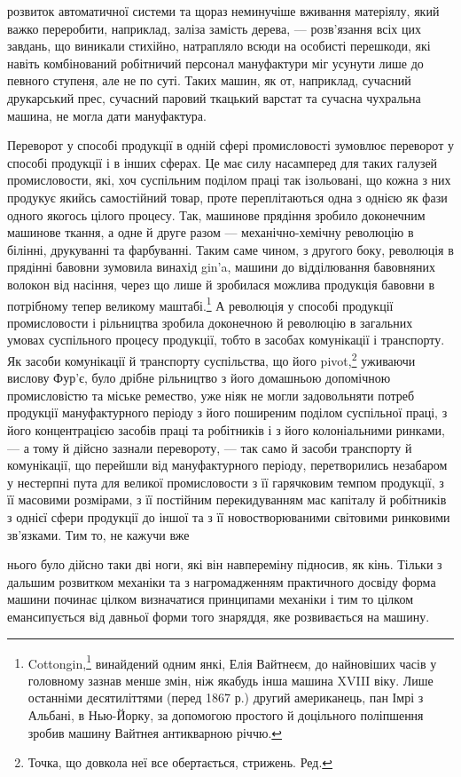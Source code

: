 розвиток автоматичної системи та щораз неминучіше вживання
матеріялу, який важко переробити, наприклад, заліза замість
дерева, — розв’язання всіх цих завдань, що виникали стихійно,
натрапляло всюди на особисті перешкоди, які навіть комбінований
робітничий персонал мануфактури міг усунути лише
до певного ступеня, але не по суті. Таких машин, як от, наприклад,
сучасний друкарський прес, сучасний паровий ткацький
варстат та сучасна чухральна машина, не могла дати
мануфактура.

Переворот у способі продукції в одній сфері промисловості
зумовлює переворот у способі продукції і в інших сферах. Це
має силу насамперед для таких галузей промисловости, які,
хоч суспільним поділом праці так ізольовані, що кожна з них
продукує якийсь самостійний товар, проте переплітаються одна
з однією як фази одного якогось цілого процесу. Так, машинове
прядіння зробило доконечним машинове ткання, а одне й друге
разом — механічно-хемічну революцію в білінні, друкуванні
та фарбуванні. Таким саме чином, з другого боку, революція в
прядінні бавовни зумовила винахід gin’a, машини до відділювання
бавовняних волокон від насіння, через що лише й зробилася
можлива продукція бавовни в потрібному тепер великому маштабі.\footnote{
Cottongin,\footnote*{
Машина, що вибирає зерно з бавовни. Ред.
} винайдений одним янкі, Елія Вайтнеєм, до найновіших
часів у головному зазнав менше змін, ніж якабудь інша машина XVIII віку.
Лише останніми десятиліттями (перед 1867 р.) другий американець, пан
Імрі з Альбані, в Нью-Йорку, за допомогою простого й доцільного
поліпшення зробив машину Вайтнея антикварною річчю.
}
А революція у способі продукції промисловости і рільництва
зробила доконечною й революцію в загальних умовах суспільного
процесу продукції, тобто в засобах комунікації і транспорту.
Як засоби комунікації й транспорту суспільства, що його
pivot,\footnote*{
Точка, що довкола неї все обертається, стрижень. Ред.
} уживаючи вислову Фур’є, було дрібне рільництво з його
домашньою допомічною промисловістю та міське ремество, уже
ніяк не могли задовольняти потреб продукції мануфактурного
періоду з його поширеним поділом суспільної праці, з його концентрацією
засобів праці та робітників і з його колоніальними
ринками, — а тому й дійсно зазнали перевороту, — так само й
засоби транспорту й комунікації, що перейшли від мануфактурного
періоду, перетворились незабаром у нестерпні пута для
великої промисловости з її гарячковим темпом продукції, з її масовими
розмірами, з її постійним перекидуванням мас капіталу й
робітників з однієї сфери продукції до іншої та з її новостворюваними
світовими ринковими зв’язками. Тим то, не кажучи вже

нього було дійсно таки дві ноги, які він навпереміну підносив, як кінь.
Тільки з дальшим розвитком механіки та з нагромадженням практичного
досвіду форма машини починає цілком визначатися принципами механіки
і тим то цілком емансипується від давньої форми того знаряддя, яке розвивається
на машину.
\parbreak{}  %
